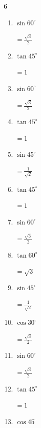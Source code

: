 \begin{multicols}{6}
\begin{enumerate}
        $\displaystyle =\frac{1}{\sqrt{3}}$

  \item $\displaystyle \sin{60^\circ}$

        $\displaystyle =\frac{\sqrt{3}}{2}$

  \item $\displaystyle \tan{45^\circ}$

        $\displaystyle =1$

  \item $\displaystyle \sin{60^\circ}$

        $\displaystyle =\frac{\sqrt{3}}{2}$

  \item $\displaystyle \tan{45^\circ}$

        $\displaystyle =1$

  \item $\displaystyle \sin{45^\circ}$

        $\displaystyle =\frac{1}{\sqrt{2}}$

  \item $\displaystyle \tan{45^\circ}$

        $\displaystyle =1$

  \item $\displaystyle \sin{60^\circ}$

        $\displaystyle =\frac{\sqrt{3}}{2}$

\columnbreak %

\resetques

  \item $\displaystyle \tan{60^\circ}$

        $\displaystyle =\sqrt{3}$

  \item $\displaystyle \sin{45^\circ}$

        $\displaystyle =\frac{1}{\sqrt{2}}$

  \item $\displaystyle \cos{30^\circ}$

        $\displaystyle =\frac{\sqrt{3}}{2}$

  \item $\displaystyle \sin{60^\circ}$

        $\displaystyle =\frac{\sqrt{3}}{2}$

  \item $\displaystyle \tan{45^\circ}$

        $\displaystyle =1$

  \item $\displaystyle \cos{45^\circ}$


\end{enumerate}
\end{multicols}
